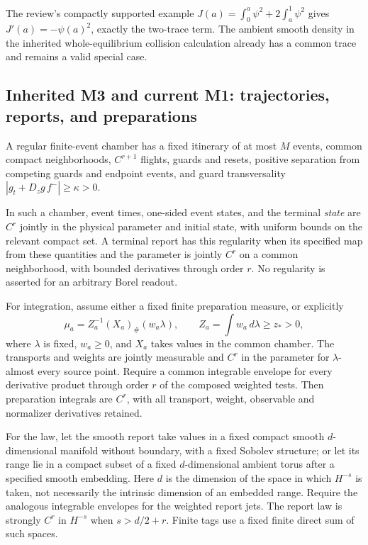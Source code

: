The review's compactly supported example
$J(a)=\int_0^a\psi^2+2\int_a^1\psi^2$ gives
$J'(a)=-\psi(a)^2$, exactly the two-trace term. The ambient smooth density
in the inherited whole-equilibrium collision calculation already has a
common trace and remains a valid special case.

\subsection{Inherited M3 and current M1: trajectories, reports, and preparations}
A regular finite-event chamber has a fixed itinerary of at most $M$ events,
common compact neighborhoods, $C^{r+1}$ flights, guards and resets, positive
separation from competing guards and endpoint events, and guard
transversality $|g_t+D_zg\,f^-|\ge\kappa>0$.

\begin{theorem}\label{thm:transport-prep}
In such a chamber, event times, one-sided event states, and the terminal
\emph{state} are $C^r$ jointly in the physical parameter and initial state,
with uniform bounds on the relevant compact set. A terminal report has this
regularity when its specified map from these quantities and the parameter
is jointly $C^r$ on a common neighborhood, with bounded derivatives through
order $r$. No regularity is asserted for an arbitrary Borel readout.

For integration, assume either a fixed finite preparation measure, or explicitly
\begin{equation}
 \mu_a=Z_a^{-1}(X_a)_\#(w_a\lambda),\qquad
 Z_a=\int w_a\,d\lambda\ge z_*>0,
 \label{eq:transport-prep}
\end{equation}
where $\lambda$ is fixed, $w_a\ge0$, and $X_a$ takes values in the common
chamber. The transports and weights are jointly measurable and $C^r$ in
the parameter for $\lambda$-almost every source point. Require a common
integrable envelope for every derivative product through order $r$ of the
composed weighted tests. Then preparation integrals are $C^r$, with all
transport, weight, observable and normalizer derivatives retained.

For the law, let the smooth report take values in a fixed compact smooth
$d$-dimensional manifold without boundary, with a fixed Sobolev structure;
or let its range lie in a compact subset of a fixed $d$-dimensional ambient
torus after a specified smooth embedding. Here $d$ is the dimension of the
space in which $H^{-s}$ is taken, not necessarily the intrinsic dimension of
an embedded range. Require the analogous integrable envelopes for the
weighted report jets. The report law is strongly $C^r$ in $H^{-s}$ when
$s>d/2+r$. Finite tags use a fixed finite direct sum of such spaces.
\end{theorem}
